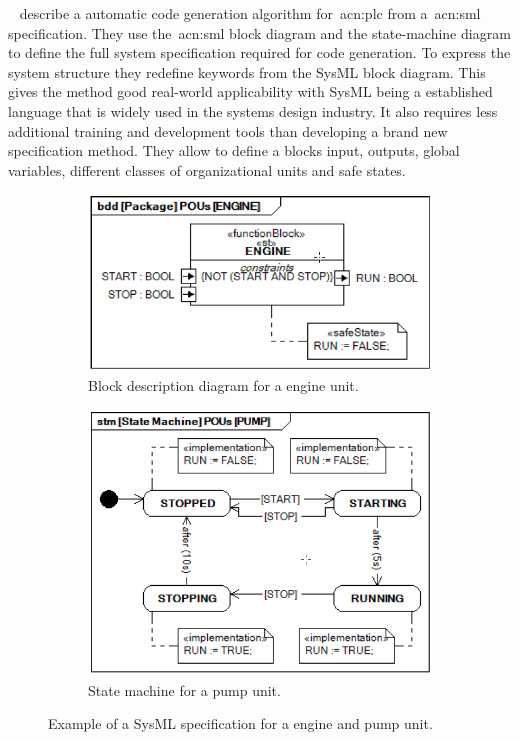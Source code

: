 \citeauthor{6957399}~\cite{6957399} describe a automatic code generation algorithm for~\acrshort{acn:plc} from a~\acrshort{acn:sml} specification.
They use the~\acrshort{acn:sml} block diagram and the state-machine diagram to define the full system specification required for code generation.
To express the system structure they redefine keywords from the SysML block diagram.
This gives the method good real-world applicability with SysML being a established language that is widely used in the systems design industry.
It also requires less additional training and development tools than developing a brand new specification method.
They allow to define a blocks input, outputs, global variables, different classes of organizational units and safe states.
\begin{figure}
	\begin{subfigure}{0.5\textwidth}
		\includegraphics[width=\textwidth]{./Figures/sysml_bdd.png}
		\caption{Block description diagram for a engine unit.}
		\label{fig:sysml:bdd}
	\end{subfigure}
	\begin{subfigure}{0.5\textwidth}
		\includegraphics[width=\textwidth]{./Figures/sysml_stm.png}
		\caption{State machine for a pump unit.}
		\label{fig:sysml:stm}
	\end{subfigure}
	\caption[Example of a SysML specification for a engine and pump unit.]{Example of a SysML specification for a engine and pump unit.~\cite{6957399}}
\end{figure}
